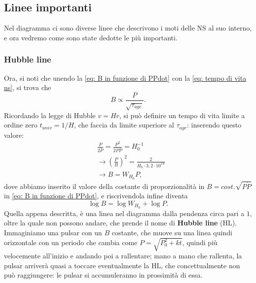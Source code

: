 \subsection{Linee importanti}
Nel diagramma ci sono diverse linee che descrivono i moti delle NS al suo interno, e ora vedremo come sono state dedotte le più importanti.
\subsubsection{Hubble line}
Ora, si noti che unendo la \eqref{eq: B in funzione di PPdot} con la \eqref{eq: tempo di vita ns}, si trova che 
\begin{equation}
    B\propto \frac{P}{\sqrt{\tau_{age}}}. 
\end{equation}
Ricordando la legge di Hubble $v=Hr$, si può definire un tempo di vita limite a ordine zero $t_{univ}=1/H$, che faccia da limite superiore al $\tau_{age}$: inserendo questo valore:
\begin{align}
    &\frac{P}{2\dot{P}}=\frac{P^2}{2P\dot{P}}=H_0^{-1}\\
    &\xrightarrow{} \left(\frac{P}{B}\right)^2=\frac{2}{H_0\cdot3,2\cdot10^{19}}\\
    &\xrightarrow{}B=W_{H_0}P,
\end{align}
dove abbiamo inserito il valore della costante di proporzionalità in $B=cost.\sqrt{P\dot{P}}$ in \eqref{eq: B in funzione di PPdot}, e riscrivendola infine diventa
\begin{equation}
    \log B = \log W_{H_0}+\log P.
    \label{eq: equazione hubble line}
\end{equation}
Quella appena descritta, è una linea nel diagramma dalla pendenza circa pari a $1$, oltre la quale non possono andare, che prende il nome di \textbf{Hubble line} (HL).
Immaginiamo una pulsar con un $B$ costante, che muove su una linea quindi orizzontale con un periodo che cambia come $P=\sqrt{P_0^2 + kt} $, quindi più velocemente all'inizio e andando poi a rallentare; mano a mano che rallenta, la pulsar arriverà quasi a toccare eventualmente la HL, che concettualmente non può raggiungere: le pulsar si accumuleranno in prossimità di essa.

